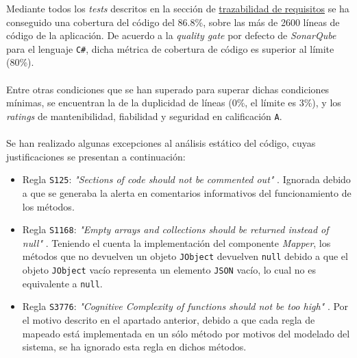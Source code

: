         \noindent Mediante todos los \textit{tests} descritos en la sección de \hyperref[subsec:trazabilidad]{trazabilidad de requisitos} se ha conseguido una cobertura del código del 86.8\%, sobre las más de 2600 líneas de código de la aplicación. De acuerdo a la \textit{quality gate} por defecto de \textit{SonarQube} para el lenguaje \texttt{C\#}, dicha métrica de cobertura de código es superior al límite (80\%).
        \\ \\
        Entre otras condiciones que se han superado para superar dichas condiciones mínimas, se encuentran la de la duplicidad de líneas (0\%, el límite es 3\%), y los \textit{ratings} de mantenibilidad, fiabilidad y seguridad en calificación \texttt{A}.
        \\ \\
        Se han realizado algunas excepciones al análisis estático del código, cuyas justificaciones se presentan a continuación:
        \begin{itemize}
            \item Regla \texttt{S125}: \textit{"Sections of code should not be commented out"} \cite{SONAR125}. Ignorada debido a que se generaba la alerta en comentarios informativos del funcionamiento de los métodos.
            \item Regla \texttt{S1168}: \textit{"Empty arrays and collections should be returned instead of null"} \cite{SONAR1168}. Teniendo el cuenta la implementación del componente \textit{Mapper}, los métodos que no devuelven un objeto \texttt{JObject} devuelven \texttt{null} debido a que el objeto \texttt{JObject} vacío representa un elemento \texttt{JSON} vacío, lo cual no es equivalente a \texttt{null}.
            \item Regla \texttt{S3776}: \textit{"Cognitive Complexity of functions should not be too high"} \cite{SONAR3776}. Por el motivo descrito en el apartado anterior, debido a que cada regla de mapeado está implementada en un sólo método por motivos del modelado del sistema, se ha ignorado esta regla en dichos métodos.
        \end{itemize}
    
\newpage